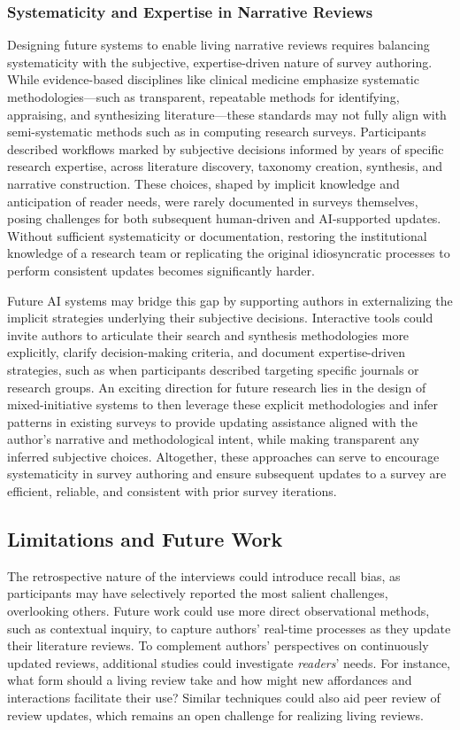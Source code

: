 \subsubsection{Systematicity and Expertise in Narrative Reviews}
Designing future systems to enable living narrative reviews requires balancing systematicity with the subjective, expertise-driven nature of survey authoring. While evidence-based disciplines like clinical medicine emphasize systematic methodologies---such as transparent, repeatable methods for identifying, appraising, and synthesizing literature---these standards may not fully align with semi-systematic methods such as in computing research surveys. Participants described workflows marked by subjective decisions informed by years of specific research expertise, across literature discovery, taxonomy creation, synthesis, and narrative construction. These choices, shaped by implicit knowledge and anticipation of reader needs, were rarely documented in surveys themselves, posing challenges for both subsequent human-driven and AI-supported updates. Without sufficient systematicity or documentation, restoring the institutional knowledge of a research team or replicating the original idiosyncratic processes to perform consistent updates becomes significantly harder.

Future AI systems may bridge this gap by supporting authors in externalizing the implicit strategies underlying their subjective decisions. Interactive tools could invite authors to articulate their search and synthesis methodologies more explicitly, clarify decision-making criteria, and document expertise-driven strategies, such as when participants described targeting specific journals or research groups. An exciting direction for future research lies in the design of mixed-initiative systems to then leverage these explicit methodologies and infer patterns in existing surveys to provide updating assistance aligned with the author’s narrative and methodological intent, while making transparent any inferred subjective choices. Altogether, these approaches can serve to encourage systematicity in survey authoring and ensure subsequent updates to a survey are efficient, reliable, and consistent with prior survey iterations.


\subsection{Limitations and Future Work}
The retrospective nature of the interviews could introduce recall bias, as participants may have selectively reported the most salient challenges, overlooking others. Future work could use more direct observational methods, such as contextual inquiry, to capture authors’ real-time processes as they update their literature reviews. To complement authors' perspectives on continuously updated reviews, additional studies could investigate \textit{readers}’ needs. For instance, what form should a living review take and how might new affordances and interactions facilitate their use? Similar techniques could also aid peer review of review updates, which remains an open challenge for realizing living reviews.
